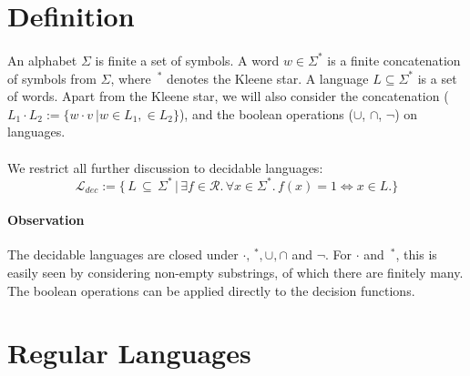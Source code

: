 \documentclass[11pt,a4paper,oneside]{book}
\begin{document}
    \section{Definition}
        \paragraph{}
        An alphabet $\Sigma$ is finite a set of symbols. 
        A word $w \in \Sigma^*$ is a finite concatenation of symbols from $\Sigma$, where $\,^*$ denotes the Kleene star. 
        A language $L \subseteq \Sigma^*$ is a set of words. 
        Apart from the Kleene star, we will also consider the concatenation ($L_1 \cdot L_2 := \{w \cdot v\ \vert w \in L_1,  \in L_2\}$), and the boolean operations ($\cup$, $\cap$, $\neg$) on languages.

        
        \paragraph{} We restrict all further discussion to decidable languages:
        \[
            \mathcal{L}_{dec} := \{ \, L \, \subseteq \, \Sigma^* \, 
                \vert \, \exists f \in \mathcal{R}. \, \forall x \in \Sigma^*. \, f(x) = 1 \Leftrightarrow  x \in L. \}
        \] 

        \paragraph{Observation} The decidable languages are closed under $\cdot, \,^*, \cup, \cap$ and $\neg$. For $\cdot$ and $\,^*$, this is easily seen by considering non-empty substrings, of which there are finitely many. The boolean operations can be applied directly to the decision functions.

        \section{Regular Languages}
        
    
\end{document}
